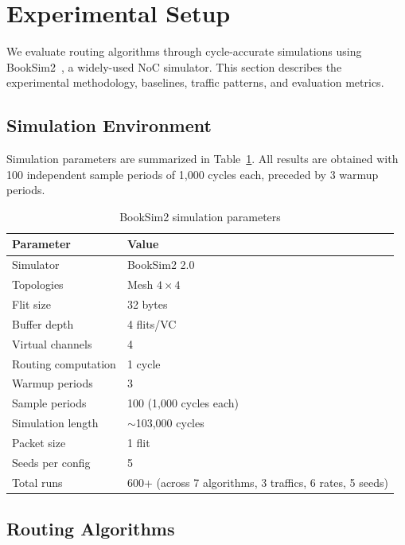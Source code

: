 \section{Experimental Setup}
\label{sec:experiments}

We evaluate routing algorithms through cycle-accurate simulations using BookSim2~\cite{booksim}, a widely-used NoC simulator. This section describes the experimental methodology, baselines, traffic patterns, and evaluation metrics.

\subsection{Simulation Environment}

Simulation parameters are summarized in Table~\ref{tab:simparams}. All results are obtained with 100 independent sample periods of 1,000 cycles each, preceded by 3 warmup periods.

\begin{table}[h]
\centering
\caption{BookSim2 simulation parameters}
\label{tab:simparams}
\begin{tabular}{ll}
\toprule
\textbf{Parameter} & \textbf{Value} \\
\midrule
Simulator & BookSim2 2.0 \\
Topologies & Mesh $4\times4$ \\
Flit size & 32 bytes \\
Buffer depth & 4 flits/VC \\
Virtual channels & 4 \\
Routing computation & 1 cycle \\
Warmup periods & 3 \\
Sample periods & 100 (1,000 cycles each) \\
Simulation length & $\sim$103,000 cycles \\
Packet size & 1 flit \\
\midrule
Seeds per config & 5 \\
Total runs & 600+ (across 7 algorithms, 3 traffics, 6 rates, 5 seeds) \\
\bottomrule
\end{tabular}
\end{table}

\subsection{Routing Algorithms}

